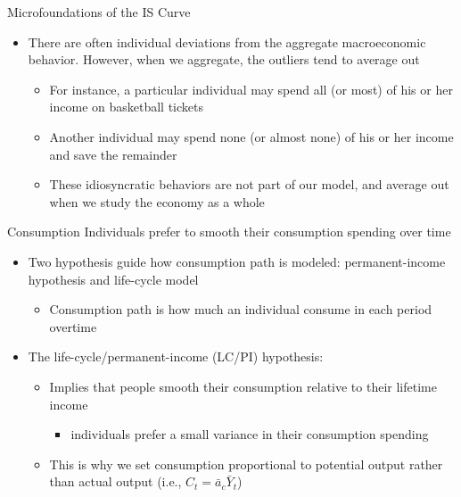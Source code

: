\documentclass[aspectratio=1610]{beamer}
\begin{document}
\begin{frame}[wide]{Microfoundations of the IS Curve}
	\begin{itemize}
		\item There are often individual deviations from the aggregate macroeconomic behavior. However, when we aggregate, the outliers tend to average out
		\vspace{4mm}
		\begin{itemize}
			\item For instance, a particular individual may spend all (or most) of his or her income on basketball tickets
			\vspace{2mm}
			\item Another individual may spend none (or almost none) of his or her income and save the remainder
			\vspace{2mm}
			\item These idiosyncratic behaviors are not part of our model, and average out when we study the economy as a whole
		\end{itemize}
	\end{itemize}
\end{frame}

\begin{frame}[wide]{Consumption}
	Individuals prefer to smooth their consumption spending over time
	\vspace{3mm}
	\begin{itemize}
		\item Two hypothesis guide how consumption path is modeled: permanent-income hypothesis and life-cycle model
	\vspace{2mm}
		\begin{itemize}
			\item Consumption path is how much an individual consume in each period overtime
		\end{itemize}
		\vspace{2mm}
		\item The life-cycle/permanent-income (LC/PI) hypothesis:
		\vspace{2mm}
		\begin{itemize}
			\item Implies that people smooth their consumption relative to their lifetime income
			\vspace{1mm}
			\begin{itemize}
				\item individuals prefer a small variance in their consumption spending
			\end{itemize}
			\vspace{1mm}
			\item This is why we set consumption proportional to potential output rather than actual output (i.e., $C_t = \bar{a}_c \bar{Y}_t$)
		\end{itemize}
	\end{itemize}
\end{frame}
\end{document}
